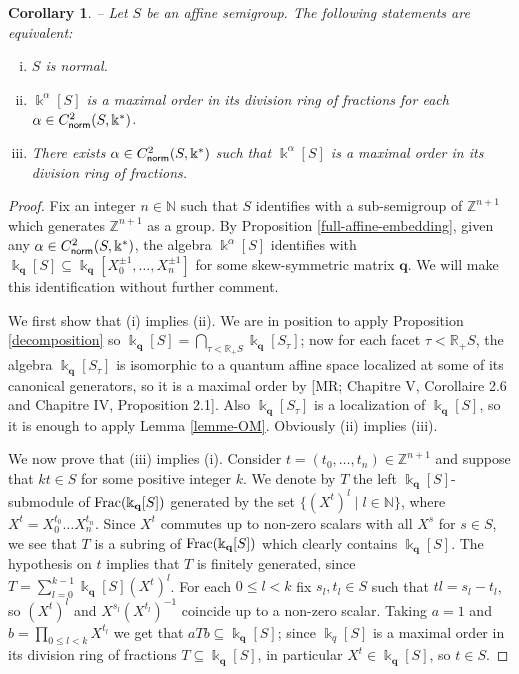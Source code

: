 \documentclass[twoside,11pt]{article}
\newcommand{\Frac}{{\rm Frac}}
\newcommand{\norm}{{\sf norm}}
\renewcommand{\k}{\Bbbk}
\newcommand{\N}{{\mathbb N}}
\newcommand{\Z}{{\mathbb Z}}
\newcommand{\RR}{{\mathbb R}}
\newcommand{\q}{{\mathbf q}}
\newtheorem{subcorollary}[subtheorem]{Corollary}
\begin{document}
\begin{subcorollary} -- \label{corollaire-OM}
Let $S$ be an affine semigroup. The following statements are equivalent:
\begin{enumerate}[(i)]
	\item $S$ is normal.
	\item $\k^\alpha[S]$ is a maximal order in its division ring of
		fractions for each $\alpha \in C^2_\norm(S,\k^*)$.
	\item There exists $\alpha \in C^2_\norm(S,\k^*)$ such that $\k^\alpha[S]$ is a
		maximal order in its division ring of fractions.
\end{enumerate}
\end{subcorollary}
\begin{proof} 
Fix an integer $n\in\N$ such that $S$ identifies with a sub-semigroup of $\Z^{n+1}$
which generates $\Z^{n+1}$ as a group. By Proposition \ref{full-affine-embedding}, given
any $\alpha\in C^2_\norm(S,\k^*)$, the algebra $\k^\alpha[S]$ identifies with $\k_\q[S]
\subseteq \k_\q[X_0^{\pm 1},\dots,X_n^{\pm 1}]$ for some skew-symmetric matrix $\q$. We will
make this identification without further comment.
 
We first show that (i) implies (ii). We are in position to apply Proposition
\ref{decomposition} so $\displaystyle \k_\q[S] = \bigcap_{\tau<\RR_+S} \k_\q[S_\tau]$; now
for each facet $\tau<\RR_+S$, the algebra $\k_\q[S_\tau]$ is isomorphic to a quantum
affine space localized at some of its canonical generators, so it is a maximal order by
[MR; Chapitre V, Corollaire 2.6 and Chapitre IV, Proposition 2.1]. Also $\k_\q[S_\tau]$ is
a localization of $\k_\q[S]$, so it is enough to apply Lemma \ref{lemme-OM}. Obviously
(ii) implies (iii).

We now prove that (iii) implies (i). Consider $t=(t_0,\dots,t_n) \in \Z^ {n+1}$ and
suppose that $kt \in S$ for some positive integer $k$. We denote by $T$ the left
$\k_\q[S]$-submodule of $\Frac(\k_\q[S])$ generated by the set $\{(X^t)^l \mid l\in\N\}$,
where $X^t = X_0^{t_0} \dots X_n^{t_n}$. Since $X^t$ commutes up to non-zero scalars with
all $X^s$ for $s\in S$, we see that $T$ is a subring of $\Frac(\k_\q[S])$ which clearly
contains $\k_\q[S]$. The hypothesis on $t$ implies that $T$ is finitely generated, since
$T = \sum_{l=0}^{k-1} \k_\q[S] (X^t)^l$. For each $0 \leq l < k$ fix $s_l, t_l \in S$ such
that $tl = s_l - t_l$, so $(X^t)^l$ and $X^{s_l}(X^{t_l})^{-1}$ coincide up to a non-zero
scalar. Taking $a=1$ and $b=\prod_{0 \le l < k} X^{t_l}$ we get that $a T b \subseteq
\k_\q[S]$; since $\k_q[S]$ is a maximal order in its division ring of fractions $T
\subseteq \k_\q[S]$, in particular $X^t \in \k_\q[S]$, so $t\in S$.
\end{proof}
\end{document}
